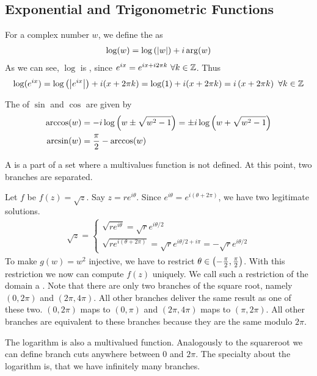 \subsection{Exponential and Trigonometric Functions}

\begin{definition}
    For a complex number $w$, we define the  as
    \begin{align*}
        \log (w) = \log \left( \left\vert w \right\vert \right) + i \arg (w)
    \end{align*}
    As we can see, $\log$ is , since $e^{ix} = e^{ix + i 2 \pi  k} \ \forall k \in \Z$.
    Thus
    \begin{align*}
        \log (e^{ix}) = \log \left( \left\vert e^{ix} \right\vert \right) + i (x+2\pi k)
        = \log(1) + i (x + 2 \pi k)
        = i \left( x + 2 \pi k \right) \ \forall k \in \mathbb{Z}
    \end{align*}
\end{definition}

\begin{definition}
    The  of $\sin$ and $\cos$ are given by
    \begin{align*}
        \arccos (w) &= -i \log \left( w \pm \sqrt{w^2 - 1} \right)
            = \pm i \log \left( w + \sqrt{w^2 -1} \right)
        \\
        \arcsin (w) &= \frac{\pi}{2} - \arccos (w)
    \end{align*}
\end{definition}

\begin{definition}
    A  is a part of a set where a multivalues function is not defined.
    At this point, two branches are separated.
\end{definition}

\begin{example}
    Let $f$ be $f(z) = \sqrt{z}$. Say $z=r e^{i \theta}$. Since $e^{i \theta} =
    e^{i (\theta + 2 \pi)}$, we have two legitimate solutions.
    \begin{align*}
        \sqrt{z}= \begin{cases}
            \sqrt{r e^{i \theta}} = \sqrt{r} e^{i \theta/2}
            \\
            \sqrt{r e^{i (\theta + 2 \pi)}} = \sqrt{r} e^{i \theta /2 + i \pi}
            = - \sqrt{r} e^{i \theta/2}
        \end{cases}
    \end{align*}
    To make $g(w) = w^2$ injective, we have to restrict $\theta \in
    \left( -\frac{\pi}{2} , \frac{\pi}{2} \right)$. With this restriction we now can
    compute $f(z)$ uniquely. We call such a restriction of the domain a .
    Note that there are only two branches of the square root, namely $(0,2\pi)$ and
    $(2\pi,4\pi)$. All other branches deliver the same result as one of these two.
    $(0,2\pi)$ maps to $(0,\pi)$ and $(2\pi,4\pi)$ maps to $(\pi,2\pi)$. All other
    branches are equivalent to these branches because they are the same modulo $2\pi$.
\end{example}

\begin{example}[Logarithm]
    The logarithm is also a multivalued function. Analogously to the squareroot
    we can define branch cuts anywhere between $0$ and $2\pi$. The specialty about
    the logarithm is, that we have infinitely many branches.
\end{example}

